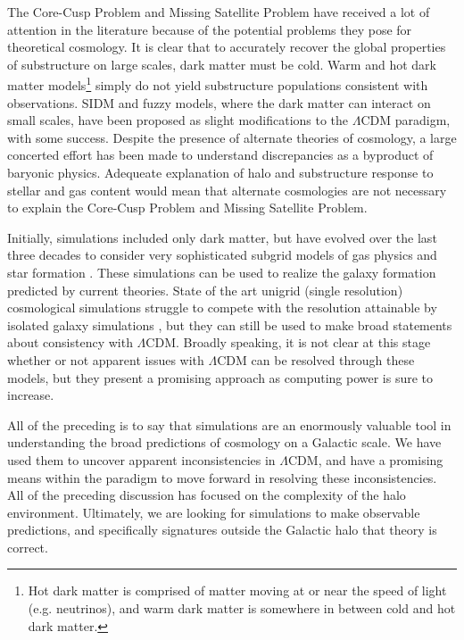 The Core-Cusp Problem and Missing Satellite Problem have received a lot of attention in the literature because of the potential problems they pose for theoretical cosmology. It is clear that to accurately recover the global properties of substructure on large scales, dark matter must be cold. Warm and hot dark matter models\footnote{Hot dark matter is comprised of matter moving at or near the speed of light (e.g. neutrinos), and warm dark matter is somewhere in between cold and hot dark matter.} simply do not yield substructure populations consistent with observations. SIDM and fuzzy models, where the dark matter can interact on small scales, have been proposed as slight modifications to the $\Lambda$CDM paradigm, with some success. Despite the presence of alternate theories of cosmology, a large concerted effort has been made to understand discrepancies as a byproduct of baryonic physics.  Adequeate explanation of halo and substructure response to stellar and gas content would mean that alternate cosmologies are not necessary to explain the Core-Cusp Problem and Missing Satellite Problem.


Initially, simulations included only dark matter, but have evolved over the last three decades to consider very sophisticated subgrid models of gas physics and star formation \citep{LucySPH,CenOstriker92,KatzSPH96,SpringelMultiphase03,Stinson2006}.  These simulations can be used to realize the galaxy formation predicted by current theories. State of the art unigrid (single resolution) cosmological simulations struggle to compete with the resolution attainable by isolated galaxy simulations \citep{Illustris,Eagle}, but they can still be used to make broad statements about consistency with $\Lambda$CDM. Broadly speaking, it is not clear at this stage whether or not apparent issues with $\Lambda$CDM can be resolved through these models, but they present a promising approach as computing power is sure to increase.


All of the preceding is to say that simulations are an enormously valuable tool in understanding the broad predictions of cosmology on a Galactic scale. We have used them to uncover apparent inconsistencies in $\Lambda$CDM, and have a promising means within the paradigm to move forward in resolving these inconsistencies. All of the preceding discussion has focused on the complexity of the halo environment. Ultimately, we are looking for simulations to make observable predictions, and specifically signatures outside the Galactic halo that theory is correct.

